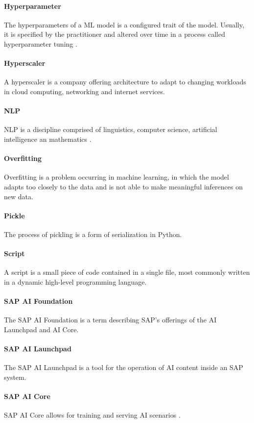 	\paragraph{Hyperparameter} The hyperparameters of a \ac{ML} model is a configured trait of the model. Usually, it is specified by the practitioner and altered over time in a process called hyperparameter tuning \cite{hyperparameter}.
	\paragraph{Hyperscaler} A hyperscaler is a company offering architecture to adapt to changing workloads in cloud computing, networking and internet services.
	\paragraph{\acf{NLP}} \ac{NLP} is a discipline comprised of linguistics, computer science, artificial intelligence an mathematics \cite[p.~51]{chowdhury2003}.
	\paragraph{Overfitting} Overfitting is a problem occurring in machine learning, in which the model adapts too closely to the data and is not able to make meaningful inferences on new data.
	\paragraph{Pickle} The process of pickling is a form of serialization in Python.
	\paragraph{Script} A script is  a small piece of code contained in a single file, most commonly written in a dynamic high-level programming language.
	\paragraph{SAP AI Foundation} The SAP AI Foundation is a term describing SAP's offerings of the AI Launchpad and AI Core.
	\paragraph{SAP AI Launchpad} The SAP AI Launchpad is a tool for the operation of AI content inside an SAP system.
	\paragraph{SAP AI Core} SAP AI Core allows for training and serving AI scenarios \cite{schmitzLeonardo}.

